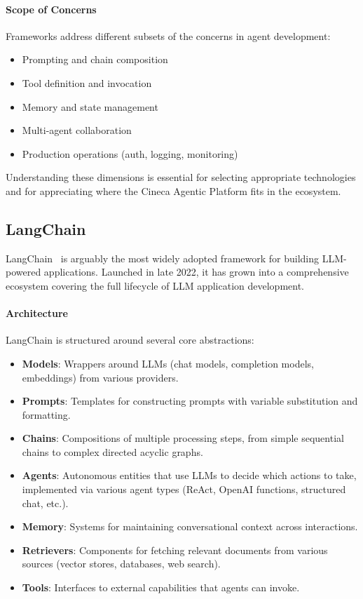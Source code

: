 \documentclass[a4paper,twoside]{sapthesis}
\begin{document}
\paragraph{Scope of Concerns}
Frameworks address different subsets of the concerns in agent development:
\begin{itemize}
    \item Prompting and chain composition
    \item Tool definition and invocation
    \item Memory and state management
    \item Multi-agent collaboration
    \item Production operations (auth, logging, monitoring)
\end{itemize}

Understanding these dimensions is essential for selecting appropriate technologies and for appreciating where the Cineca Agentic Platform fits in the ecosystem.

\subsection{LangChain}

LangChain~\cite{langchain2023}
is arguably the most widely adopted framework for building LLM-powered applications. Launched in late 2022, it has grown into a comprehensive ecosystem covering the full lifecycle of LLM application development.

\paragraph{Architecture}
LangChain is structured around several core abstractions:
\begin{itemize}
    \item \textbf{Models}: Wrappers around LLMs (chat models, completion models, embeddings) from various providers.
    \item \textbf{Prompts}: Templates for constructing prompts with variable substitution and formatting.
    \item \textbf{Chains}: Compositions of multiple processing steps, from simple sequential chains to complex directed acyclic graphs.
    \item \textbf{Agents}: Autonomous entities that use LLMs to decide which actions to take, implemented via various agent types (ReAct, OpenAI functions, structured chat, etc.).
    \item \textbf{Memory}: Systems for maintaining conversational context across interactions.
    \item \textbf{Retrievers}: Components for fetching relevant documents from various sources (vector stores, databases, web search).
    \item \textbf{Tools}: Interfaces to external capabilities that agents can invoke.
\end{itemize}
\end{document}
